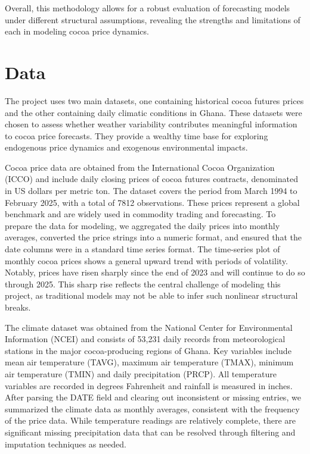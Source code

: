 \documentclass[
  letterpaper,
  DIV=11,
  numbers=noendperiod]{scrartcl}
\begin{document}
Overall, this methodology allows for a robust evaluation of forecasting
models under different structural assumptions, revealing the strengths
and limitations of each in modeling cocoa price dynamics.

\hypertarget{data}{%
\section{Data}\label{data}}

The project uses two main datasets, one containing historical cocoa
futures prices and the other containing daily climatic conditions in
Ghana. These datasets were chosen to assess whether weather variability
contributes meaningful information to cocoa price forecasts. They
provide a wealthy time base for exploring endogenous price dynamics and
exogenous environmental impacts.

Cocoa price data are obtained from the International Cocoa Organization
(ICCO) and include daily closing prices of cocoa futures contracts,
denominated in US dollars per metric ton. The dataset covers the period
from March 1994 to February 2025, with a total of 7812 observations.
These prices represent a global benchmark and are widely used in
commodity trading and forecasting. To prepare the data for modeling, we
aggregated the daily prices into monthly averages, converted the price
strings into a numeric format, and ensured that the date columns were in
a standard time series format. The time-series plot of monthly cocoa
prices shows a general upward trend with periods of volatility. Notably,
prices have risen sharply since the end of 2023 and will continue to do
so through 2025. This sharp rise reflects the central challenge of
modeling this project, as traditional models may not be able to infer
such nonlinear structural breaks.

The climate dataset was obtained from the National Center for
Environmental Information (NCEI) and consists of 53,231 daily records
from meteorological stations in the major cocoa-producing regions of
Ghana. Key variables include mean air temperature (TAVG), maximum air
temperature (TMAX), minimum air temperature (TMIN) and daily
precipitation (PRCP). All temperature variables are recorded in degrees
Fahrenheit and rainfall is measured in inches. After parsing the DATE
field and clearing out inconsistent or missing entries, we summarized
the climate data as monthly averages, consistent with the frequency of
the price data. While temperature readings are relatively complete,
there are significant missing precipitation data that can be resolved
through filtering and imputation techniques as needed.
\end{document}
